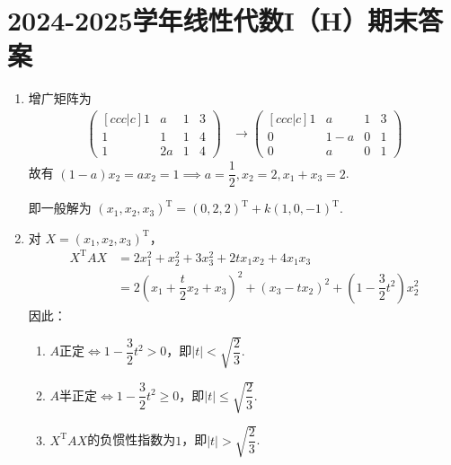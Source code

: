 \section{2024-2025学年线性代数I（H）期末答案}

\begin{enumerate}
    \item 增广矩阵为
    \begin{align*}
        \begin{pmatrix}[ccc|c]
        1 & a & 1 & 3 \\
        1 & 1 & 1 & 4 \\
        1 & 2a & 1 & 4
        \end{pmatrix} & \to
        \begin{pmatrix}[ccc|c]
        1 & a & 1 & 3 \\
        0 & 1 - a & 0 & 1 \\
        0 & a & 0 & 1
        \end{pmatrix}
    \end{align*}
    故有 \((1 - a)x_{2} = ax_{2} = 1 \implies a = \dfrac{1}{2}, x_{2} = 2, x_{1} + x_{3} = 2\).

    即一般解为 \((x_{1}, x_{2}, x_{3})^\mathrm{T}=(0,2,2)^\mathrm{T}+k(1,0,-1)^\mathrm{T}\).

    \item 对 \(X=(x_1,x_2,x_3)^\mathrm{T}\)，
    \begin{align*}
        X^\mathrm{T}AX &= 2x_{1}^{2}+x_{2}^{2}+3x_{3}^{2}+2tx_{1}x_{2}+4x_{1}x_{3} \\
        &= 2\left(x_{1}+\dfrac{t}{2}x_{2}+x_{3}\right)^{2}+\left(x_{3}-tx_{2}\right)^{2}+\left(1-\dfrac{3}{2}t^{2}\right)x_{2}^{2}
    \end{align*}
    因此：
    \begin{enumerate}
        \item \(A\)正定\(\iff 1-\dfrac{3}{2}t^{2}>0\)，即\(\vert t\vert<\sqrt{\dfrac{2}{3}}\).
        \item \(A\)半正定\(\iff 1-\dfrac{3}{2}t^{2} \geqslant 0\)，即\(\vert t\vert \leqslant \sqrt{\dfrac{2}{3}}\).
        \item \(X^\mathrm{T}AX\)的负惯性指数为\(1\)，即\(\vert t\vert > \sqrt{\dfrac{2}{3}}\).
    \end{enumerate}


\end{enumerate}
